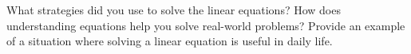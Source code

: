 \documentclass[12pt]{article}
\begin{document}
\vspace{1em}

\begin{tcolorbox}[colframe=black!60, colback=white, 
coltitle=black, colbacktitle=black!15, fonttitle=\bfseries\Large, 
title=Reflection, halign title=center, left=10pt, right=10pt, top=10pt, bottom=80pt]
What strategies did you use to solve the linear equations? How does understanding equations help you solve real-world problems? Provide an example of a situation where solving a linear equation is useful in daily life.
\end{tcolorbox}
\end{document}
